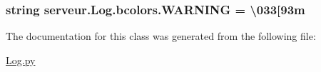 \subsubsection[{W\+A\+R\+N\+I\+N\+G}]{\setlength{\rightskip}{0pt plus 5cm}string serveur.\+Log.\+bcolors.\+W\+A\+R\+N\+I\+N\+G = \textquotesingle{} \textbackslash{}033\mbox{[}93m \textquotesingle{}\hspace{0.3cm}{\ttfamily [static]}}\label{classserveur_1_1_log_1_1bcolors_ae706a7991852f73775de2e14ad7e19e4}


The documentation for this class was generated from the following file\+:\begin{DoxyCompactItemize}
\item 
\hyperlink{_log_8py}{Log.\+py}\end{DoxyCompactItemize}
